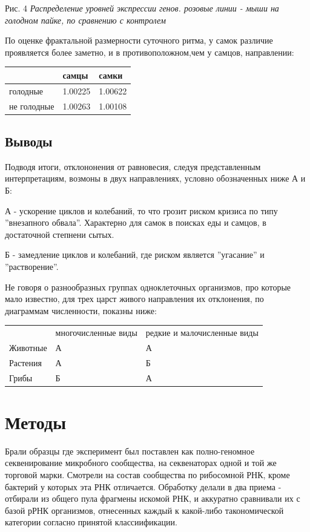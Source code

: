 \documentclass[a4paper]{article}
\begin{document}
Рис. 4 \textit{Распределение уровней экспрессии генов. розовые линии - мыши на голодном пайке, по сравнению с контролем}

По оценке фрактальной размерности суточного ритма, у самок различие проявляется более заметно, и в противоположном,чем у самцов, направлении:

\begin{tabular}{lll}
\hline
&самцы&самки\\
\hline
голодные&1.00225 &1.00622\\
не голодные&1.00263&1.00108\\
\hline
\end{tabular}

\subsection*{Выводы}

Подводя итоги, отклононения от равновесия, следуя представленным интерпретациям, возмоны в двух направлениях, условно обозначенных ниже А и Б:

А - ускорение циклов и колебаний, то что грозит риском кризиса по типу ''внезапного обвала''. Характерно для самок в поисках еды и самцов, в достаточной степнени сытых.

Б - замедление циклов и колебаний, где риском является ''угасание'' и ''растворение''.

Не говоря о разнообразных группах одноклеточных организмов, про которые мало известно, для трех царст живого направления их отклонения, по диаграммам численности, показны ниже:

\begin{tabular}{lll}
\hline
&многочисленные виды&редкие и малочисленные виды\\
Животные&А&А\\
Растения&А&Б\\
Грибы&Б&А\\
\hline
\end{tabular}

\section{Методы}

Брали образцы где эксперимент был поставлен как полно-геномное секвенирование микробного сообщества, на секвенаторах одной и той же торговой марки. Смотрели на состав сообщества по рибосомной РНК, кроме бактерий у которых эта РНК отличается. Обработку делали в два приема - отбирали из общего пула фрагмены искомой РНК, и аккуратно сравнивали их с базой рРНК организмов, отнесенных каждый к какой-либо такономической категории согласно принятой классиификации.
\end{document}
